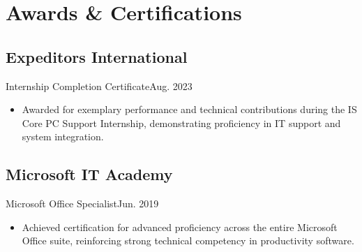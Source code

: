 \section{Awards \& Certifications}
\subsection{Expeditors International}{Internship Completion Certificate}{}{Aug. 2023}
\begin{itemize}
    \item Awarded for exemplary performance and technical contributions during the IS Core PC Support Internship, demonstrating proficiency in IT support and system integration.
\end{itemize}

\subsection{Microsoft IT Academy}{Microsoft Office Specialist}{}{Jun. 2019}
\begin{itemize}
    \item Achieved certification for advanced proficiency across the entire Microsoft Office suite, reinforcing strong technical competency in productivity software.
\end{itemize}
